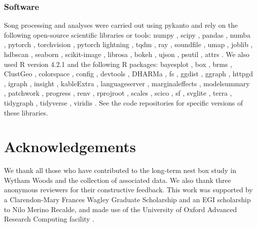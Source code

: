 \documentclass[9pt, onecolumn, twoside, lineno]{gsajnl}
\begin{document}
\subsubsection{Software}
\begin{sloppypar}
Song processing and analyses were carried out using pykanto \autocite{merinorecalde2023} and rely on the following open-source scientific libraries or tools: numpy \autocite{numpy2020}, scipy \autocite{scipy2020}, pandas \autocite{pandas2023}, numba \autocite{lam2015}, pytorch \autocite{pytorch2019}, torchvision \autocite{torchvision2016}, pytorch lightning \autocite{pytorchlightning2019}, tqdm \autocite{tqdm2019}, ray \autocite{moritz2018}, soundfile \autocite{bechtold2022}, umap \autocite{mcinnes2018},  joblib \autocite{joblib2020}, hdbscan \autocite{mcinnes2017}, seaborn \autocite{Waskom2021}, scikit-image \autocite{scikitimage2014}, librosa \autocite{mcfee2015}, bokeh \autocite{bokeh2018}, ujson \autocite{ujason2023}, psutil \autocite{psutil2023}, attrs \autocite{schlawack2019}. We also used R version 4.2.1 \autocite{base} and the following R packages: bayesplot \autocite{bayesplot2019, bayesplot2022}, box \autocite{box}, brms \autocite{brms2017, brms2021}, ClustGeo \autocite{ClustGeo}, colorspace \autocite{colorspace2020a}, config \autocite{config}, devtools \autocite{devtools}, DHARMa \autocite{DHARMa}, fs \autocite{fs}, ggdist \autocite{ggdist}, ggraph \autocite{ggraph}, httpgd \autocite{httpgd}, igraph \autocite{igraph2006, igraph2024}, insight \autocite{insight}, kableExtra \autocite{kableExtra}, languageserver \autocite{languageserver}, marginaleffects \autocite{marginaleffects}, modelsummary \autocite{modelsummary}, patchwork \autocite{patchwork}, progress \autocite{progress}, renv \autocite{renv}, rprojroot \autocite{rprojroot}, scales \autocite{scales}, scico \autocite{scico}, sf \autocite{sf2018, sf2023}, svglite \autocite{svglite}, terra \autocite{terra}, tidygraph \autocite{tidygraph}, tidyverse \autocite{tidyverse}, viridis \autocite{viridis}. See the code repositories for specific versions of these libraries.
\end{sloppypar}

\section{Acknowledgements}

We thank all those who have contributed to the long-term nest box study in Wytham Woods and the collection of associated data. We also thank three anonymous reviewers for their constructive feedback. This work was supported by a Clarendon-Mary Frances Wagley Graduate Scholarship and an EGI scholarship to Nilo Merino Recalde, and made use of the University of Oxford Advanced Research Computing facility \autocite{richards2015}.
\end{document}

